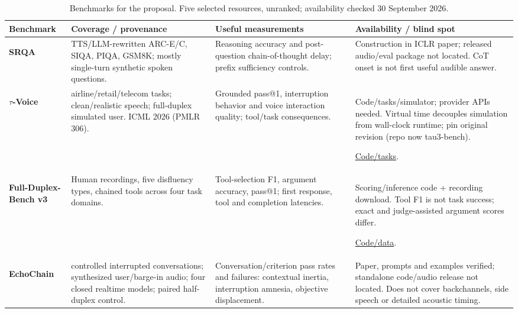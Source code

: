 \begin{table}[H]
\centering
\small
\setlength{\tabcolsep}{4pt}
\setlength{\tablewidth}{\dimexpr\linewidth-6\tabcolsep\relax}
\renewcommand{\arraystretch}{1.12}
\caption{Benchmarks for the proposal. Five selected resources, unranked; availability checked 30 September 2026.}
\label{tab:benchmarks}
\begin{tabular}{@{}>{\raggedright\arraybackslash}p{0.22\tablewidth}>{\raggedright\arraybackslash}p{0.28\tablewidth}>{\raggedright\arraybackslash}p{0.25\tablewidth}>{\raggedright\arraybackslash}p{0.25\tablewidth}@{}}
\toprule
\textbf{Benchmark} & \textbf{Coverage / provenance} & \textbf{Useful measurements} & \textbf{Availability / blind spot} \\
\midrule
\textbf{SRQA}\par\citep{thinklisten} & TTS/LLM-rewritten ARC-E/C, SIQA, PIQA, GSM8K; mostly single-turn synthetic spoken questions. & Reasoning accuracy and post-question chain-of-thought delay; prefix sufficiency controls. & Construction in ICLR paper; released audio/eval package not located. CoT onset is not first useful audible answer. \\
\addlinespace[4pt]
\textbf{$\tau$-Voice}\par\citep{tauvoice} & 278 airline/retail/telecom tasks; clean/realistic speech; full-duplex simulated user. ICML 2026 (PMLR 306). & Grounded pass@1, interruption behavior and voice interaction quality; tool/task consequences. & Code/tasks/simulator; provider APIs needed. Virtual time decouples simulation from wall-clock runtime; pin original revision (repo now tau3-bench).\par \href{https://github.com/sierra-research/tau2-bench}{Code/tasks}. \\
\addlinespace[4pt]
\textbf{Full-Duplex-Bench v3}\par\citep{fdb3} & Human recordings, five disfluency types, chained tools across four task domains. & Tool-selection F1, argument accuracy, pass@1; first response, tool and completion latencies. & Scoring/inference code + recording download. Tool F1 is not task success; exact and judge-assisted argument scores differ.\par \href{https://github.com/DanielLin94144/Full-Duplex-Bench/tree/main/v3}{Code/data}. \\
\addlinespace[4pt]
\textbf{EchoChain}\par\citep{echochain} & 200 controlled interrupted conversations; synthesized user/barge-in audio; four closed realtime models; paired half-duplex control. & Conversation/criterion pass rates and failures: contextual inertia, interruption amnesia, objective displacement. & Paper, prompts and examples verified; standalone code/audio release not located. Does not cover backchannels, side speech or detailed acoustic timing. \\

\end{tabular}
\end{table}
